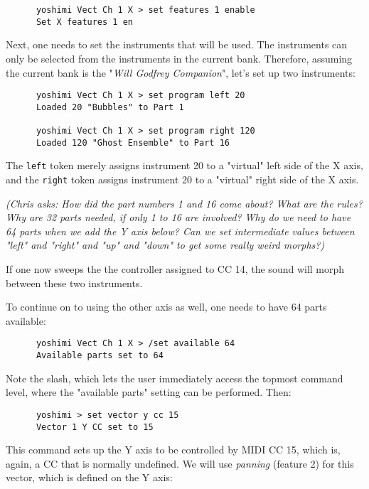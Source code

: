    \begin{verbatim}
      yoshimi Vect Ch 1 X > set features 1 enable
      Set X features 1 en
   \end{verbatim}

   Next, one needs to set the instruments that will be used.
   The instruments can only be selected from the instruments
   in the current bank. Therefore, assuming the current bank is
   the "\textsl{Will Godfrey Companion}", let's set up two instruments:

   \begin{verbatim}
      yoshimi Vect Ch 1 X > set program left 20
      Loaded 20 "Bubbles" to Part 1

      yoshimi Vect Ch 1 X > set program right 120
      Loaded 120 "Ghost Ensemble" to Part 16
   \end{verbatim}

   The \texttt{left} token merely assigns instrument 20 to a "virtual"
   left side of the X axis,
   and the \texttt{right} token assigns instrument 20 to a "virtual"
   right side of the X axis.

   \textsl{(Chris asks:  How did the part numbers 1 and 16 come about? What
   are the rules?  Why are 32 parts needed, if only 1 to 16 are involved?  Why
   do we need to have 64 parts when we add the Y axis below?  Can we set
   intermediate values between "left" and "right" and "up" and "down" to
   get some really weird morphs?)}

   If one now sweeps the the controller assigned to CC 14,
   the sound will morph between these two instruments.

   To continue on to using the other axis as well, one needs to have 64 parts
   available:

   \begin{verbatim}
      yoshimi Vect Ch 1 X > /set available 64
      Available parts set to 64
   \end{verbatim}

   Note the slash, which lets the user immediately access the topmost command
   level, where the "available parts" setting can be performed.
   Then:

   \begin{verbatim}
      yoshimi > set vector y cc 15
      Vector 1 Y CC set to 15
   \end{verbatim}

   This command sets up the Y axis to be controlled by MIDI CC 15, which is,
   again, a CC that is normally undefined.
   We will use \textsl{panning} (feature 2) for this vector, which is defined
   on the Y axis:

